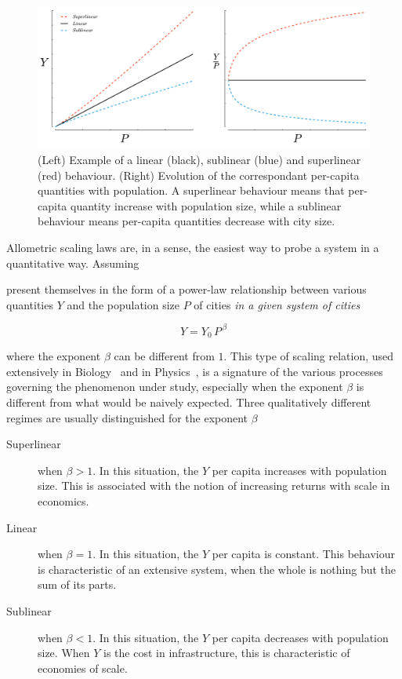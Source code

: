\begin{figure}
    \centering
    \includegraphics[width=\textwidth]{gfx/chapter-scaling/scaling_scheme.pdf}
    \caption{(Left) Example of a linear (black), sublinear (blue) and superlinear (red)
    behaviour. (Right) Evolution of the correspondant per-capita quantities with
population. A superlinear behaviour means that per-capita quantity increase with
population size, while a sublinear behaviour means per-capita quantities
decrease with city size.\label{fig:scaling_scheme}}
\end{figure}

Allometric scaling laws are, in a sense, the easiest way to probe a system in a
quantitative way. Assuming 

present themselves in the form of a power-law
relationship between various quantities $Y$ and the population size $P$ of
cities \emph{in a given system of cities} 

\begin{equation}
    Y = Y_0\,P^{\,\beta}
    \label{eq:scaling_definition}
\end{equation}

where the exponent $\beta$ can be different from $1$. This type of scaling
relation, used extensively in Biology~\cite{Thompson:1942} and in
Physics~\cite{Barenblatt:1996}, is a signature of the various processes
governing the phenomenon under study, especially when the exponent $\beta$ is
different from what would be naively expected. Three qualitatively different regimes are
usually
distinguished for the exponent $\beta$~\cite{Bettencourt:2007}

\begin{description}
    \item[Superlinear] when $\beta>1$. In this situation, the $Y$ per capita
        increases with population size. This is associated with the notion of
        increasing returns with scale in economics.
    \item[Linear] when $\beta=1$. In this situation, the $Y$ per capita is
        constant. This behaviour is characteristic of an extensive system, when
        the whole is nothing but the sum of its parts.
    \item[Sublinear] when $\beta<1$. In this situation, the $Y$ per capita
        decreases with population size. When $Y$ is the cost in infrastructure,
        this is characteristic of economies of scale.
\end{description}    

